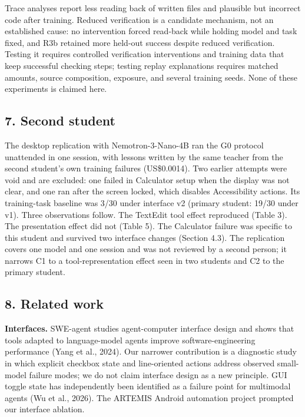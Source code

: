 \documentclass[
  10pt,
]{article}
\begin{document}
Trace analyses report less reading back of written files and plausible
but incorrect code after training. Reduced verification is a candidate
mechanism, not an established cause: no intervention forced read-back
while holding model and task fixed, and R3b retained more held-out
success despite reduced verification. Testing it requires controlled
verification interventions and training data that keep successful
checking steps; testing replay explanations requires matched amounts,
source composition, exposure, and several training seeds. None of these
experiments is claimed here.

\subsection{7. Second student}\label{second-student}

The desktop replication with Nemotron-3-Nano-4B ran the G0 protocol
unattended in one session, with lessons written by the same teacher from
the second student's own training failures (US\$0.0014). Two earlier
attempts were void and are excluded: one failed in Calculator setup when
the display was not clear, and one ran after the screen locked, which
disables Accessibility actions. Its training-task baseline was 3/30
under interface v2 (primary student: 19/30 under v1). Three observations
follow. The TextEdit tool effect reproduced (Table 3). The presentation
effect did not (Table 5). The Calculator failure was specific to this
student and survived two interface changes (Section 4.3). The
replication covers one model and one session and was not reviewed by a
second person; it narrows C1 to a tool-representation effect seen in two
students and C2 to the primary student.

\subsection{8. Related work}\label{related-work}

\textbf{Interfaces.} SWE-agent studies agent-computer interface design
and shows that tools adapted to language-model agents improve
software-engineering performance (Yang et al., 2024). Our narrower
contribution is a diagnostic study in which explicit checkbox state and
line-oriented actions address observed small-model failure modes; we do
not claim interface design as a new principle. GUI toggle state has
independently been identified as a failure point for multimodal agents
(Wu et al., 2026). The ARTEMIS Android automation project prompted our
interface ablation.
\end{document}
